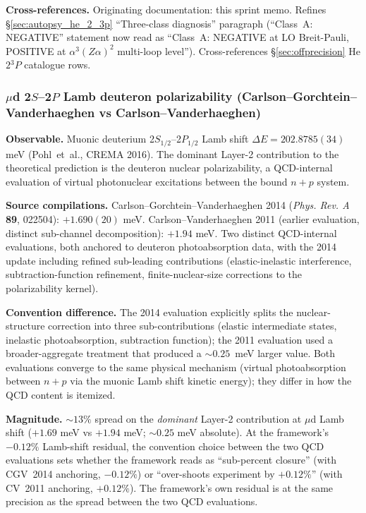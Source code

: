 \documentclass[11pt]{article}
\begin{document}
\textbf{Cross-references.}  Originating documentation: this sprint memo.
Refines \S\ref{sec:autopsy_he_2_3p} ``Three-class diagnosis'' paragraph
(``Class~A: NEGATIVE'' statement now read as ``Class~A: NEGATIVE at LO
Breit-Pauli, POSITIVE at $\alpha^3(Z\alpha)^2$ multi-loop level'').
Cross-references \S\ref{sec:offprecision} He $2{}^3P$ catalogue rows.

\subsubsection{$\mu$d 2$S$--2$P$ Lamb deuteron polarizability
(Carlson--Gorchtein--Vanderhaeghen vs Carlson--Vanderhaeghen)}
\label{sec:conv_d_polarizability_mud_lamb}

\textbf{Observable.}  Muonic deuterium 2$S_{1/2}$--2$P_{1/2}$ Lamb
shift $\Delta E = 202.8785(34)$ meV (Pohl~et~al., CREMA 2016).
The dominant Layer-2 contribution to the theoretical prediction
is the deuteron nuclear polarizability, a QCD-internal evaluation
of virtual photonuclear excitations between the bound $n+p$ system.

\textbf{Source compilations.}  Carlson--Gorchtein--Vanderhaeghen 2014
(\emph{Phys. Rev. A} \textbf{89}, 022504): $+1.690(20)$ meV.
Carlson--Vanderhaeghen 2011 (earlier evaluation, distinct
sub-channel decomposition): $+1.94$ meV.  Two distinct QCD-internal
evaluations, both anchored to deuteron photoabsorption data, with
the 2014 update including refined sub-leading contributions
(elastic-inelastic interference, subtraction-function refinement,
finite-nuclear-size corrections to the polarizability kernel).

\textbf{Convention difference.}  The 2014 evaluation explicitly
splits the nuclear-structure correction into three sub-contributions
(elastic intermediate states, inelastic photoabsorption, subtraction
function); the 2011 evaluation used a broader-aggregate treatment
that produced a $\sim 0.25$~meV larger value.  Both evaluations
converge to the same physical mechanism (virtual photoabsorption
between $n+p$ via the muonic Lamb shift kinetic energy); they
differ in how the QCD content is itemized.

\textbf{Magnitude.}  $\sim 13\%$ spread on the \emph{dominant}
Layer-2 contribution at $\mu$d Lamb shift ($+1.69$ meV vs
$+1.94$ meV; $\sim 0.25$ meV absolute).  At the framework's
$-0.12\%$ Lamb-shift residual, the convention choice between the
two QCD evaluations sets whether the framework reads as
``sub-percent closure'' (with CGV~2014 anchoring, $-0.12\%$) or
``over-shoots experiment by $+0.12\%$'' (with CV~2011 anchoring,
$+0.12\%$).  The framework's own residual is at the same precision
as the spread between the two QCD evaluations.
\end{document}
